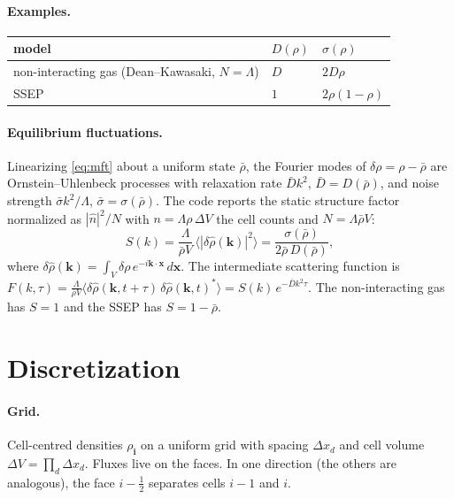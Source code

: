 \documentclass[11pt]{article}
\begin{document}
\paragraph{Examples.}
\begin{center}
\begin{tabular}{lll}
\toprule
model & $D(\rho)$ & $\sigma(\rho)$ \\
\midrule
non-interacting gas (Dean--Kawasaki, $N=\Lambda$) & $D$ & $2D\rho$ \\
SSEP & $1$ & $2\rho(1-\rho)$ \\
\bottomrule
\end{tabular}
\end{center}

\paragraph{Equilibrium fluctuations.}
Linearizing \eqref{eq:mft} about a uniform state $\bar\rho$, the Fourier
modes of $\delta\rho=\rho-\bar\rho$ are Ornstein--Uhlenbeck processes
with relaxation rate $\bar D k^2$, $\bar D = D(\bar\rho)$, and noise strength
$\bar\sigma k^2/\Lambda$, $\bar\sigma=\sigma(\bar\rho)$. The code reports the
static structure factor normalized as $|\hat n|^2/N$ with
$n=\Lambda\rho\,\Delta V$ the cell counts and $N=\Lambda\bar\rho V$:
\begin{equation}\label{eq:S}
  S(k) = \frac{\Lambda}{\bar\rho V}\,\big\langle|\delta\hat\rho(\mathbf{k})|^2\big\rangle
       = \frac{\sigma(\bar\rho)}{2\bar\rho\,D(\bar\rho)},
\end{equation}
where $\delta\hat\rho(\mathbf{k}) = \int_V \delta\rho\, e^{-i\mathbf{k}\cdot\mathbf{x}}\,d\mathbf{x}$.
The intermediate scattering function is
$F(k,\tau) = \frac{\Lambda}{\bar\rho V}\langle\delta\hat\rho(\mathbf{k},t+\tau)\,
\delta\hat\rho(\mathbf{k},t)^*\rangle = S(k)\,e^{-\bar Dk^2\tau}$.
The non-interacting gas has $S=1$ and the SSEP has $S=1-\bar\rho$.

\section{Discretization}

\paragraph{Grid.}
Cell-centred densities $\rho_{\mathbf{i}}$ on a uniform grid with spacing
$\Delta x_d$ and cell volume $\Delta V=\prod_d\Delta x_d$. Fluxes live on the
faces. In one direction (the others are analogous), the face $i-\tfrac12$
separates cells $i-1$ and $i$.
\end{document}
